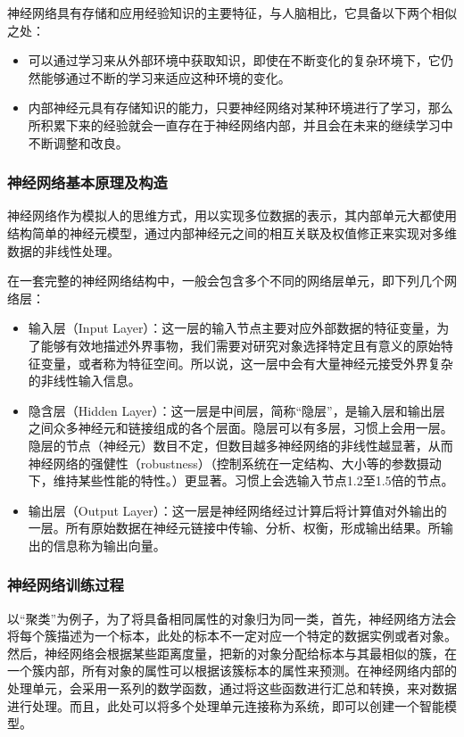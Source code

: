 神经网络具有存储和应用经验知识的主要特征，与人脑相比，它具备以下两个相似之处：
\begin{itemize}[noitemsep,topsep=0pt,parsep=0pt,partopsep=0pt]
	\item 可以通过学习来从外部环境中获取知识，即使在不断变化的复杂环境下，它仍然能够通过不断的学习来适应这种环境的变化。
	\item 内部神经元具有存储知识的能力，只要神经网络对某种环境进行了学习，那么所积累下来的经验就会一直存在于神经网络内部，并且会在未来的继续学习中不断调整和改良。
\end{itemize}

\subsubsection{神经网络基本原理及构造}
神经网络作为模拟人的思维方式，用以实现多位数据的表示，其内部单元大都使用结构简单的神经元模型，通过内部神经元之间的相互关联及权值修正来实现对多维数据的非线性处理。

在一套完整的神经网络结构中，一般会包含多个不同的网络层单元，即下列几个网络层：
\begin{itemize}[noitemsep,topsep=0pt,parsep=0pt,partopsep=0pt]
	\item 输入层（Input Layer）：这一层的输入节点主要对应外部数据的特征变量，为了能够有效地描述外界事物，我们需要对研究对象选择特定且有意义的原始特征变量，或者称为特征空间。所以说，这一层中会有大量神经元接受外界复杂的非线性输入信息。
	\item 隐含层（Hidden Layer）：这一层是中间层，简称“隐层”，是输入层和输出层之间众多神经元和链接组成的各个层面。隐层可以有多层，习惯上会用一层。隐层的节点（神经元）数目不定，但数目越多神经网络的非线性越显著，从而神经网络的强健性（robustness）（控制系统在一定结构、大小等的参数摄动下，维持某些性能的特性。）更显著。习惯上会选输入节点1.2至1.5倍的节点。
	\item 输出层（Output Layer）：这一层是神经网络经过计算后将计算值对外输出的一层。所有原始数据在神经元链接中传输、分析、权衡，形成输出结果。所输出的信息称为输出向量。
\end{itemize}

\subsubsection{神经网络训练过程}
以“聚类”为例子，为了将具备相同属性的对象归为同一类，首先，神经网络方法会将每个簇描述为一个标本，此处的标本不一定对应一个特定的数据实例或者对象。然后，神经网络会根据某些距离度量，把新的对象分配给标本与其最相似的簇，在一个簇内部，所有对象的属性可以根据该簇标本的属性来预测。在神经网络内部的处理单元，会采用一系列的数学函数，通过将这些函数进行汇总和转换，来对数据进行处理。而且，此处可以将多个处理单元连接称为系统，即可以创建一个智能模型。

